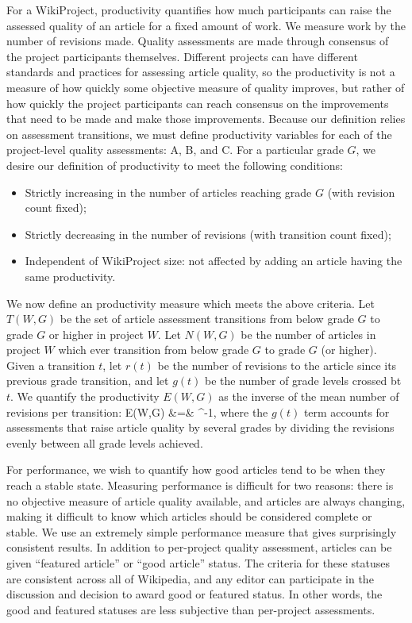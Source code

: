 For a WikiProject, productivity quantifies how much participants can raise the
assessed quality of an article for a fixed amount of work.
We measure work by the number of revisions made.
Quality assessments are made through consensus of the project participants themselves.
Different projects can have different standards and practices for assessing article quality,
so the productivity is not a measure of how quickly some objective measure of quality improves,
but rather of how quickly the project participants can reach consensus on the improvements that
need to be made and make those improvements.
Because our definition relies on assessment transitions,
we must define productivity variables for
each of the project-level quality assessments: A, B, and C.
For a particular grade $G$,
we desire our definition of productivity to meet the following conditions:
\begin{itemize}
\setlength\itemsep{0pt}
\item{Strictly increasing in the number of articles reaching grade $G$ (with revision count fixed);}
\item{Strictly decreasing in the number of revisions (with transition count fixed);}
\item{Independent of WikiProject size: not affected by adding an article having the same productivity.}
\end{itemize}

We now define an productivity measure which meets the above criteria.
Let $T(W,G)$ be the set of article assessment transitions from below grade $G$
to grade $G$ or higher in project $W$.
Let $N(W,G)$ be the number of articles in project $W$ which ever transition
from below grade $G$ to grade $G$ (or higher).
Given a transition $t$,
let $r(t)$ be the number of revisions to the article
since its previous grade transition,
and let $g(t)$ be the number of grade levels crossed bt $t$.
We quantify the productivity $E(W,G)$ as the inverse of the mean number of revisions
per transition:
\beq
E(W,G)
&=&
^{-1},
\eeq
where the $g(t)$ term accounts for assessments that raise article quality by
several grades by
dividing the revisions evenly between all grade levels achieved.

For performance, we wish to quantify how good articles tend to be when they reach a stable state.
Measuring performance is difficult for two reasons:
there is no objective measure of article quality available,
and articles are always changing, making it difficult to know which articles should be considered
complete or stable.
We use an extremely simple performance measure that gives surprisingly consistent results.
In addition to per-project quality assessment, articles can be given ``featured article'' or
``good article'' status.
The criteria for these statuses are consistent across all of Wikipedia,
and any editor can participate in the discussion and decision to award good or featured
status.
In other words, the good and featured statuses are less subjective than per-project assessments.

